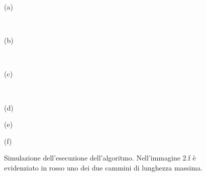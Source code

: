     \begin{figure}[ht]
        \begin{center}
            \begin{minipage}[t]{0.3\textwidth}
                (a)
                
                ~
            \end{minipage}
            \begin{minipage}[t]{0.3\textwidth}
                (b)
                
                ~
            \end{minipage}
            \begin{minipage}[t]{0.3\textwidth}
                (c)
                
                ~
            \end{minipage}
            \begin{minipage}[t]{0.3\textwidth}
                (d)
            \end{minipage}
            \begin{minipage}[t]{0.3\textwidth}
                (e)
            \end{minipage}
            \begin{minipage}[t]{0.3\textwidth}
                (f)
            \end{minipage}
        \end{center}
        \caption{\protect \centering Simulazione dell'esecuzione dell'algoritmo. Nell'immagine 2.f è evidenziato in rosso uno dei due cammini di lunghezza massima.\label{fig2}}
    \end{figure}
    
